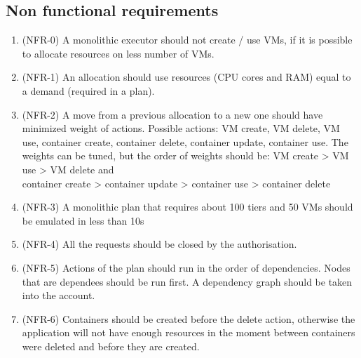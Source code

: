 \clearpage
\subsection{Non functional requirements}
\begin{enumerate}
    \item (NFR-0) A monolithic executor should not create / use VMs, if it is possible to allocate resources on less number of VMs.
    \item (NFR-1) An allocation should use resources (CPU cores and RAM) equal to a demand (required in a plan).
    \item (NFR-2) A move from a previous allocation to a new one should have minimized weight of actions. Possible actions: VM create, VM delete, VM use, container create, container delete, container update, container use. The weights can be tuned, but the order of weights should be: VM create \textgreater{} VM use \textgreater{} VM delete  and \\
    container create \textgreater{} container update \textgreater{} container use \textgreater{} container delete
    \item (NFR-3) A monolithic plan that requires about 100 tiers and 50 VMs should be emulated in less than 10s
    \item (NFR-4) All the requests should be closed by the authorisation.
    \item (NFR-5) Actions of the plan should run in the order of dependencies. Nodes that are dependees should be run first. A dependency graph should be taken into the account.
    \item (NFR-6) Containers should be created before the delete action, otherwise the application will not have enough resources in the moment between containers were deleted and before they are created.
\end{enumerate}

